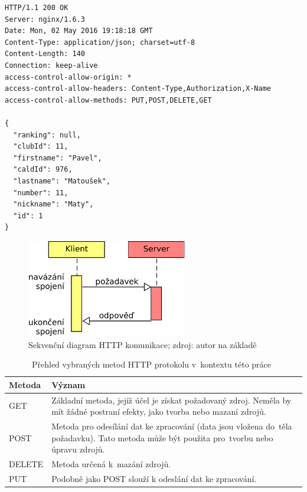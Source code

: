 \begingroup
\fontsize{9.5pt}{11pt}\selectfont
\begin{verbatim}
HTTP/1.1 200 OK
Server: nginx/1.6.3
Date: Mon, 02 May 2016 19:18:18 GMT
Content-Type: application/json; charset=utf-8
Content-Length: 140
Connection: keep-alive
access-control-allow-origin: *
access-control-allow-headers: Content-Type,Authorization,X-Name
access-control-allow-methods: PUT,POST,DELETE,GET

{
  "ranking": null,
  "clubId": 11,
  "firstname": "Pavel",
  "caldId": 976,
  "lastname": "Matoušek",
  "number": 11,
  "nickname": "Maty",
  "id": 1
}
\end{verbatim}
\endgroup

\begin{figure}[ht!]
  \centering
  \includegraphics[width=70mm]{./images/http-komunikace.pdf}
  \caption{Sekvenční diagram HTTP komunikace; zdroj: autor na základě~\cite{rest_vse}\label{overflow}}
\end{figure}

\begin{table}[ht!]
  \centering
  \begin{tabular}{|l|p{10.1cm}|}
    \hline
    \textbf{Metoda} & \textbf{Význam}\\
    \hline
    GET & Základní metoda, jejíž účel je získat požadovaný zdroj. Neměla by mít žádné postraní efekty, jako tvorba nebo mazaní zdrojů.\\
    \hline
    POST & Metoda pro odesílání dat ke zpracování (data jsou vložena do~těla požadavku). Tato metoda může být použita pro~tvorbu nebo úpravu zdrojů.\\
    \hline
    DELETE & Metoda určená k~mazání zdrojů.\\
    \hline
    PUT & Podobně jako POST slouží k odeslání dat ke zpracování.\\
    \hline
  \end{tabular}
  \caption{Přehled vybraných metod HTTP protokolu v~kontextu této práce~\cite{http_metody}}
  \label{tab:http_metody}
\end{table}

